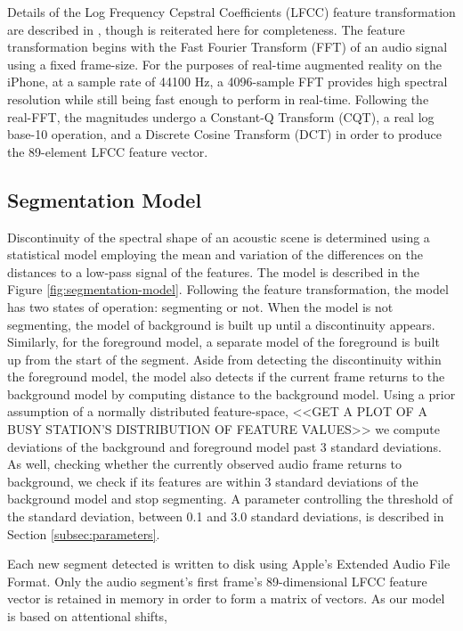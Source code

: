 \documentclass[a4paper,10pt,final]{ThesisStyle}
\begin{document}
Details of the Log Frequency Cepstral Coefficients (LFCC) feature transformation are described in \cite{CaseyICMC2007}, though is reiterated here for completeness.  The feature transformation begins with the Fast Fourier Transform (FFT) of an audio signal using a fixed frame-size.  For the purposes of real-time augmented reality on the iPhone, at a sample rate of 44100 Hz, a 4096-sample FFT provides high spectral resolution while still being fast enough to perform in real-time.  Following the real-FFT, the magnitudes undergo a Constant-Q Transform (CQT), a real log base-10 operation, and a Discrete Cosine Transform (DCT) in order to produce the 89-element LFCC feature vector.

\subsection{Segmentation Model}

Discontinuity of the spectral shape of an acoustic scene is determined using a statistical model employing the mean and variation of the differences on the distances to a low-pass signal of the features.  The model is described in the Figure \ref{fig:segmentation-model}.  Following the feature transformation, the model has two states of operation: segmenting or not.  When the model is not segmenting, the model of background is built up until a discontinuity appears.  Similarly, for the foreground model, a separate model of the foreground is built up from the start of the segment.  Aside from detecting the discontinuity within the foreground model, the model also detects if the current frame returns to the background model by computing distance to the background model.  Using a prior assumption of a normally distributed feature-space, <<GET A PLOT OF A BUSY STATION'S DISTRIBUTION OF FEATURE VALUES>> we compute deviations of the background and foreground model past 3 standard deviations.  As well, checking whether the currently observed audio frame returns to background, we check if its features are within 3 standard deviations of the background model and stop segmenting.  A parameter controlling the threshold of the standard deviation, between 0.1 and 3.0 standard deviations, is described in Section \ref{subsec:parameters}.

Each new segment detected is written to disk using Apple's Extended Audio File Format.  Only the audio segment's first frame's 89-dimensional LFCC feature vector is retained in memory in order to form a matrix of vectors.  As our model is based on attentional shifts,
\end{document}
